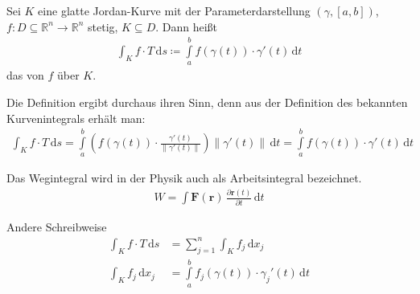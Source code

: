 \begin{theorem}[Definition]
  Sei $K$ eine glatte Jordan-Kurve mit der Parameterdarstellung $(\gamma,[a,b])$, $f : D \subseteq \mathbb{R}^n \to \mathbb{R}^n$ stetig, $K \subseteq D$. Dann heißt
  \begin{align*}
    \int_K f \cdot T \, \mathrm{d}s \coloneq \int\limits_{a}^{b} f(\gamma(t)) \cdot \gamma'(t) \, \mathrm{d}t
  \end{align*}
  das  von $f$ über $K$.
\end{theorem}

\begin{notice}
  \begin{enum-arab}
    \item Die Definition ergibt durchaus ihren Sinn, denn aus der Definition des bekannten Kurvenintegrals erhält man:
    \begin{align*}
      \int_K f \cdot T \, \mathrm{d}s = \int\limits_{a}^{b} \left( f(\gamma(t)) \cdot \frac{\gamma'(t)}{\|\gamma'(t)\|} \right) \|\gamma'(t)\| \, \mathrm{d}t = \int\limits_{a}^{b} f(\gamma(t)) \cdot \gamma'(t) \, \mathrm{d}t
    \end{align*}

    \item Das Wegintegral wird in der Physik auch als Arbeitsintegral bezeichnet.
    \begin{align*}
      W = \int \bm{F}(\bm{r}) \, \frac{\partial \bm{r}(t)}{\partial t} \, \mathrm{d}t
    \end{align*}
    
    \item Andere Schreibweise
    \begin{align*}
      \int_K f \cdot T \, \mathrm{d}s &= \sum\limits_{j=1}^{n} \int_K f_j \, \mathrm{d}x_j \\
      \int_K f_j \, \mathrm{d}x_j &= \int\limits_{a}^{b} f_j(\gamma(t)) \cdot \gamma_j'(t) \, \mathrm{d}t
    \end{align*}
  \end{enum-arab}
\end{notice}


